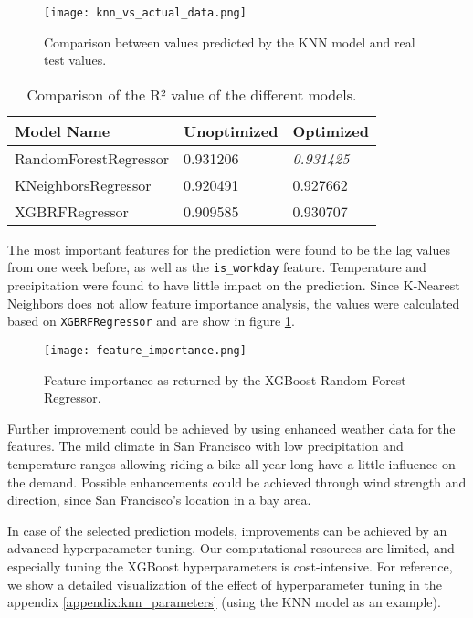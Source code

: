 \begin{figure}[hbtp]
    \texttt{[image: knn\_vs\_actual\_data.png]}
    \caption{Comparison between values predicted by the KNN model and real test values.}
\end{figure}

\begin{table}[!ht]
    \centering
    \begin{tabular}{|l|l|l|}
    \hline
        \textbf{Model Name} & \textbf{Unoptimized} & \textbf{Optimized} \\ \hline
        RandomForestRegressor & 0.931206 & \textit{0.931425} \\ \hline
        KNeighborsRegressor & 0.920491 & 0.927662 \\ \hline
        XGBRFRegressor & 0.909585 & 0.930707 \\ \hline
    \end{tabular}
    \caption{Comparison of the R² value of the different models.}
\end{table}

The most important features for the prediction were found to be the lag values from one week before, as well as the \texttt{is\_workday} feature. Temperature and precipitation were found to have little impact on the prediction. Since K-Nearest Neighbors does not allow feature importance analysis, the values were calculated based on \texttt{XGBRFRegressor} and are show in figure \ref{fig:feature_importance}.

\begin{figure}[hbtp]
    \centering
    \texttt{[image: feature\_importance.png]}
    \caption{Feature importance as returned by the XGBoost Random Forest Regressor.}
    \label{fig:feature_importance}
\end{figure}

Further improvement could be achieved by using enhanced weather data for the features. The mild climate in San Francisco with low precipitation and temperature ranges allowing riding a bike all year long have a little influence on the demand. Possible enhancements could be achieved through wind strength and direction, since San Francisco's location in a bay area.
 
In case of the selected prediction models, improvements can be achieved by an advanced hyperparameter tuning. Our computational resources are limited, and especially tuning the XGBoost hyperparameters is cost-intensive. For reference, we show a detailed visualization of the effect of hyperparameter tuning  in the appendix \ref{appendix:knn_parameters} (using the KNN model as an example).

